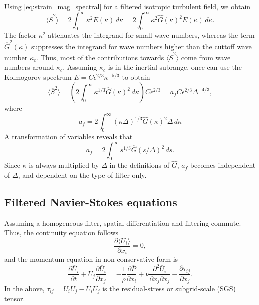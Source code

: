 \documentclass[oneside,a4paper,11pt]{report}
\newcommand{\rs}{\tau}          %
\newcommand{\uiavg}{\langle U_i \rangle}
\begin{document}
Using \cref{eq:strain_mag_spectral} for a filtered isotropic turbulent field, we obtain
\begin{equation}
\langle \overline{S}^2 \rangle = 2 \int_0^\infty \kappa^2 \overline{E}(\kappa) \,d\kappa = 2 \int_0^\infty \kappa^2 \hat{G}(\kappa)^2 E(\kappa) \,d\kappa.
\end{equation}
The factor $\kappa^2$ attenuates the integrand for small wave numbers, whereas the term $\hat{G}^2(\kappa)$ suppresses the integrand for wave numbers higher than the cuttoff wave number $\kappa_c$. Thus, most of the contributions towards $\langle \overline{S}^2 \rangle$ come from wave numbers around $\kappa_c$. Assuming $\kappa_c$ is in the inertial subrange, once can use the Kolmogorov spectrum $E = C \epsilon^{2/3} \kappa^{-5/3}$ to obtain
\begin{equation}
\label{eq:S2_estimate}
\langle \overline{S}^2 \rangle = \left ( 2 \int_0^\infty \kappa^{1/3} \hat{G}(\kappa)^2 \,d\kappa \right ) C \epsilon^{2/3} = a_f C \epsilon^{2/3} \Delta^{-4/3},
\end{equation}
where 
\begin{equation}
a_f = 2 \int_0^\infty ( \kappa \Delta )^{1/3} \hat{G}(\kappa)^2 \Delta \, d\kappa 
\end{equation}
A transformation of variables reveals that
\begin{equation}
a_f = 2 \int_0^\infty s^{1/3} \hat{G} (s/\Delta )^2\, ds.
\end{equation}
Since $\kappa$ is always multiplied by $\Delta$ in the definitions of $\hat{G}$, $a_f$ becomes independent of $\Delta$, and dependent on the type of filter only.

\subsection{Filtered Navier-Stokes equations}

Assuming a homogeneous filter, spatial differentiation and filtering commute. Thus, the continuity equation follows
\begin{equation}
\frac{\partial \uiavg}{\partial x_i} = 0,
\end{equation}
and the momentum equation in non-conservative form is
\begin{equation}
\frac{\partial \overline{U}_i}{\partial t} + \overline{U}_j \frac{\partial \overline{U}_i}{\partial x_j} = -\frac{1}{\rho} \frac{\partial \overline{P}}{\partial x_i} + \nu \frac{\partial^2 \overline{U}_i}{\partial x_j \partial x_j} - \frac{\partial \rs_{ij}}{\partial x_j}.
\end{equation}
In the above, $\rs_{ij} = \overline{ U_i U_j} - \overline{U}_i \overline{U}_j$ is the residual-stress or subgrid-scale (SGS) tensor.
\end{document}
